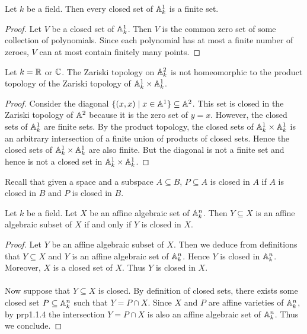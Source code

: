 \documentclass[a4paper]{article}
\begin{document}
\begin{lmm}{}{} Let $k$ be a field. Then every closed set of $\mathbb{A}_k^1$ is a finite set. \tcbline
\begin{proof}
Let $V$ be a closed set of $\mathbb{A}_k^1$. Then $V$ is the common zero set of some collection of polynomials. Since each polynomial has at most a finite number of zeroes, $V$ can at most contain finitely many points. 
\end{proof}
\end{lmm}

\begin{eg}{}{} Let $k=\mathbb{R}$ or $\mathbb{C}$. The Zariski topology on $\mathbb{A}_k^2$ is not homeomorphic to the product topology of the Zariski topology of $\mathbb{A}_k^1\times\mathbb{A}_k^1$. \tcbline
\begin{proof}
Consider the diagonal $\{(x,x)\;|\;x\in\mathbb{A}^1\}\subseteq\mathbb{A}^2$. This set is closed in the Zariski topology of $\mathbb{A}^2$ because it is the zero set of $y=x$. However, the closed sets of $\mathbb{A}_k^1$ are finite sets. By the product topology, the closed sets of $\mathbb{A}_k^1\times\mathbb{A}_k^1$ is an arbitrary intersection of a finite union of products of closed sets. Hence the closed sets of $\mathbb{A}_k^1\times\mathbb{A}_k^1$ are also finite. But the diagonal is not a finite set and hence is not a closed set in $\mathbb{A}_k^1\times\mathbb{A}_k^1$. 
\end{proof}
\end{eg}

Recall that given a space and a subspace $A\subseteq B$, $P\subseteq A$ is closed in $A$ if $A$ is closed in $B$ and $P$ is closed in $B$. 

\begin{lmm}{}{} Let $k$ be a field. Let $X$ be an affine algebraic set of $\mathbb{A}_k^n$. Then $Y\subseteq X$ is an affine algebraic subset of $X$ if and only if $Y$ is closed in $X$. \tcbline
\begin{proof}
Let $Y$ be an affine algebraic subset of $X$. Then we deduce from definitions that $Y\subseteq X$ and $Y$ is an affine algebraic set of $\mathbb{A}_k^n$. Hence $Y$ is closed in $\mathbb{A}_k^n$. Moreover, $X$ is a closed set of $X$. Thus $Y$ is closed in $X$. \\~\\

Now suppose that $Y\subseteq X$ is closed. By definition of closed sets, there exists some closed set $P\subseteq\mathbb{A}_k^n$ such that $Y=P\cap X$. Since $X$ and $P$ are affine varieties of $\mathbb{A}_k^n$, by prp1.1.4 the intersection $Y=P\cap X$ is also an affine algebraic set of $\mathbb{A}_k^n$. Thus we conclude. 
\end{proof}
\end{lmm}
\end{document}
